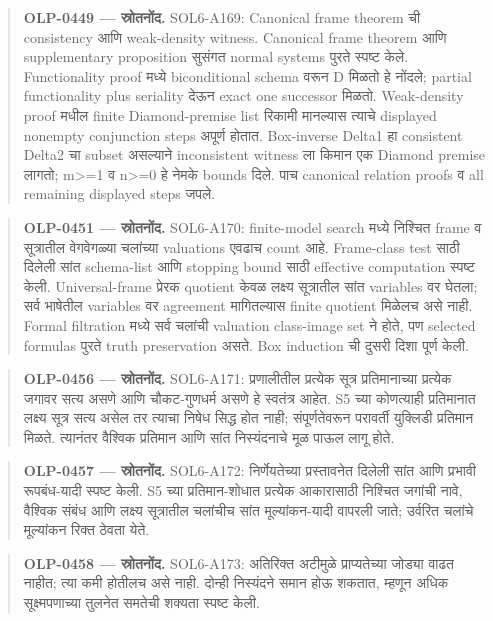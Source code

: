 \begin{quote}\small\textbf{OLP-0449 — स्रोतनोंद.} SOL6-A169: Canonical frame theorem ची consistency आणि weak-density witness. Canonical frame theorem आणि supplementary proposition सुसंगत normal systems पुरते स्पष्ट केले. Functionality proof मध्ये biconditional schema वरून D मिळतो हे नोंदले; partial functionality plus seriality देऊन exact one successor मिळतो. Weak-density proof मधील finite Diamond-premise list रिकामी मानल्यास त्याचे displayed nonempty conjunction steps अपूर्ण होतात. Box-inverse Delta1 हा consistent Delta2 चा subset असल्याने inconsistent witness ला किमान एक Diamond premise लागतो; m>=1 व n>=0 हे नेमके bounds दिले. पाच canonical relation proofs व all remaining displayed steps जपले.\end{quote}
\begin{quote}\small\textbf{OLP-0451 — स्रोतनोंद.} SOL6-A170: finite-model search मध्ये निश्चित frame व सूत्रातील वेगवेगळ्या चलांच्या valuations एवढाच count आहे. Frame-class test साठी दिलेली सांत schema-list आणि stopping bound साठी effective computation स्पष्ट केली. Universal-frame प्रेरक quotient केवळ लक्ष्य सूत्रातील सांत variables वर घेतला; सर्व भाषेतील variables वर agreement मागितल्यास finite quotient मिळेलच असे नाही. Formal filtration मध्ये सर्व चलांची valuation class-image set ने होते, पण selected formulas पुरते truth preservation असते. Box induction ची दुसरी दिशा पूर्ण केली.\end{quote}
\begin{quote}\small\textbf{OLP-0456 — स्रोतनोंद.} SOL6-A171: प्रणालीतील प्रत्येक सूत्र प्रतिमानाच्या प्रत्येक जगावर सत्य असणे आणि चौकट-गुणधर्म असणे हे स्वतंत्र आहेत. S5 च्या कोणत्याही प्रतिमानात लक्ष्य सूत्र सत्य असेल तर त्याचा निषेध सिद्ध होत नाही; संपूर्णतेवरून परावर्ती युक्लिडी प्रतिमान मिळते. त्यानंतर वैश्विक प्रतिमान आणि सांत निस्यंदनाचे मूळ पाऊल लागू होते.\end{quote}
\begin{quote}\small\textbf{OLP-0457 — स्रोतनोंद.} SOL6-A172: निर्णेयतेच्या प्रस्तावनेत दिलेली सांत आणि प्रभावी रूपबंध-यादी स्पष्ट केली. S5 च्या प्रतिमान-शोधात प्रत्येक आकारासाठी निश्चित जगांची नावे, वैश्विक संबंध आणि लक्ष्य सूत्रातील चलांचीच सांत मूल्यांकन-यादी वापरली जाते; उर्वरित चलांचे मूल्यांकन रिक्त ठेवता येते.\end{quote}
\begin{quote}\small\textbf{OLP-0458 — स्रोतनोंद.} SOL6-A173: अतिरिक्त अटीमुळे प्राप्यतेच्या जोड्या वाढत नाहीत; त्या कमी होतीलच असे नाही. दोन्ही निस्यंदने समान होऊ शकतात, म्हणून अधिक सूक्ष्मपणाच्या तुलनेत समतेची शक्यता स्पष्ट केली.\end{quote}
